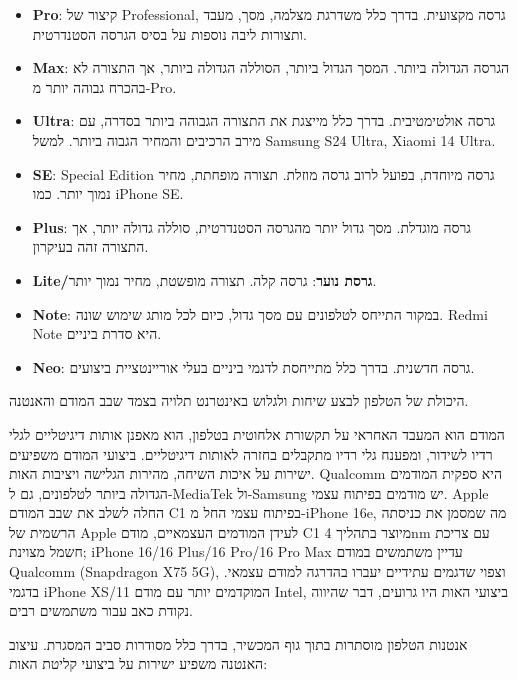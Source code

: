 \begin{itemize}
  \item \textbf{Pro}: קיצור של Professional, גרסה מקצועית. בדרך כלל משדרגת מצלמה, מסך, מעבד ותצורות ליבה נוספות על בסיס הגרסה הסטנדרטית.
  \item \textbf{Max}: הגרסה הגדולה ביותר. המסך הגדול ביותר, הסוללה הגדולה ביותר, אך התצורה לא בהכרח גבוהה יותר מ-Pro.
  \item \textbf{Ultra}: גרסה אולטימטיבית. בדרך כלל מייצגת את התצורה הגבוהה ביותר בסדרה, עם מירב הרכיבים והמחיר הגבוה ביותר. למשל Samsung S24 Ultra, Xiaomi 14 Ultra.
  \item \textbf{SE}: Special Edition גרסה מיוחדת, בפועל לרוב גרסה מוזלת. תצורה מופחתת, מחיר נמוך יותר. כמו iPhone SE.
  \item \textbf{Plus}: גרסה מוגדלת. מסך גדול יותר מהגרסה הסטנדרטית, סוללה גדולה יותר, אך התצורה זהה בעיקרון.
  \item \textbf{Lite/גרסת נוער}: גרסה קלה. תצורה מופשטת, מחיר נמוך יותר.
  \item \textbf{Note}: במקור התייחס לטלפונים עם מסך גדול, כיום לכל מותג שימוש שונה. Redmi Note היא סדרת ביניים.
  \item \textbf{Neo}: גרסה חדשנית. בדרך כלל מתייחסת לדגמי ביניים בעלי אוריינטציית ביצועים.
\end{itemize}


היכולת של הטלפון לבצע שיחות ולגלוש באינטרנט תלויה בצמד שבב המודם והאנטנה.


המודם הוא המעבד האחראי על תקשורת אלחוטית בטלפון, הוא מאפנן אותות דיגיטליים לגלי רדיו לשידור, ומפענח גלי רדיו מתקבלים בחזרה לאותות דיגיטליים. ביצועי המודם משפיעים ישירות על איכות השיחה, מהירות הגלישה ויציבות האות. Qualcomm היא ספקית המודמים הגדולה ביותר לטלפונים, גם ל-MediaTek ול-Samsung יש מודמים בפיתוח עצמי. Apple החלה לשלב את שבב המודם C1 בפיתוח עצמי החל מ-iPhone 16e, מה שמסמן את כניסתה הרשמית של Apple לעידן המודמים העצמאיים, מודם C1 מיוצר בתהליך 4nm עם צריכת חשמל מצוינת; iPhone 16/16 Plus/16 Pro/16 Pro Max עדיין משתמשים במודם Qualcomm (Snapdragon X75 5G), וצפוי שדגמים עתידיים יעברו בהדרגה למודם עצמאי. בדגמי iPhone XS/11 המוקדמים יותר עם מודם Intel, ביצועי האות היו גרועים, דבר שהיווה נקודת כאב עבור משתמשים רבים.


אנטנות הטלפון מוסתרות בתוך גוף המכשיר, בדרך כלל מסודרות סביב המסגרת. עיצוב האנטנה משפיע ישירות על ביצועי קליטת האות:

